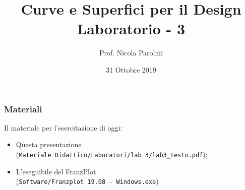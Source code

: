 \documentclass{beamer}
\title[Curve e Sup. - Lab 3]{Curve e Superfici per il Design \\ Laboratorio - 3}
\author[Prof. Parolini]{Prof. Nicola Parolini}
\date{31 Ottobre 2019}
\newcommand{\frnzplt}{FranzPlot }
\begin{document}
\begin{frame}
\maketitle
\end{frame}

\begin{frame}
\frametitle{Materiali}
Il materiale per l'esercitazione di oggi:
\begin{itemize}
\item Questa presentazione \\ (\texttt{Materiale Didattico/Laboratori/lab 3/lab3\_testo.pdf});
\item L'eseguibile del \frnzplt \\ (\texttt{Software/Franzplot 19.08 - Windows.exe})
\end{itemize}
\end{frame}


\end{document}
